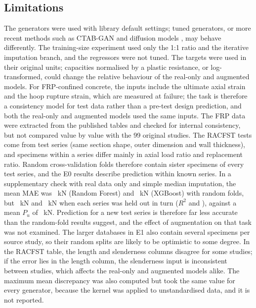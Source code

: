 \documentclass[pdflatex,sn-basic]{sn-jnl}
\begin{document}
\subsection{Limitations}\label{sec:limits}
The generators were used with library default settings; tuned generators, or more recent methods such as
CTAB-GAN \citep{zhao2021ctabgan} and diffusion models \citep{kotelnikov2023tabddpm}, may behave differently. The
training-size experiment used only the 1:1 ratio and the iterative imputation branch, and the regressors were not
tuned. The targets were used in their original units; capacities normalised by a plastic resistance, or
log-transformed, could change the relative behaviour of the real-only and augmented models. For FRP-confined
concrete, the inputs include the ultimate axial strain and the hoop rupture strain, which are measured at
failure; the task is therefore a consistency model for test data rather than a pre-test design prediction, and
both the real-only and augmented models used the same inputs. The FRP data were extracted from the published
tables and checked for internal consistency, but not compared value by value with the 99 original studies. The
RACFST tests come from \seriesCount{} test series (same section shape, outer dimension and wall thickness), and
specimens within a series differ mainly in axial load ratio and replacement ratio. Random cross-validation folds
therefore contain sister specimens of every test series, and the E0 results describe prediction within known
series. In a supplementary check with real data only and simple median imputation, the mean MAE was
\seriesMaeRandRF~kN (Random Forest) and \seriesMaeRandXGB~kN (XGBoost) with random folds, but
\seriesMaeLosoRF~kN and \seriesMaeLosoXGB~kN when each series was held out in turn ($R^2$ \seriesRtwoLosoRF{}
and \seriesRtwoLosoXGB), against a mean $P_u$ of \puMean~kN. Prediction for a new test series is therefore far less accurate than the random-fold results
suggest, and the effect of augmentation on that task was not examined. The larger databases in E1 also contain
several specimens per source study, so their random splits are likely to be optimistic to some degree. In
the RACFST table, the length and slenderness columns disagree for some studies; if the error lies in the length
column, the slenderness input is inconsistent between studies, which affects the real-only and augmented models
alike. The
maximum mean discrepancy was also computed but took the same value for every generator, because the kernel was
applied to unstandardised data, and it is not reported.
\end{document}
